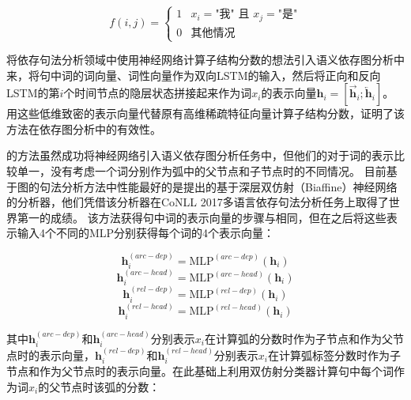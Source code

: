 \begin{equation}
f(i,j)=
\begin{cases}
1& x_i = \text{"我" 且\ } x_j = \text{"是"} \\
0& \text{其他情况}
\end{cases}
\end{equation}

将依存句法分析领域中使用神经网络计算子结构分数的想法引入语义依存图分析中来，将句中词的词向量、词性向量作为双向LSTM的输入，然后将正向和反向LSTM的第$i$个时间节点的隐层状态拼接起来作为词$x_i$的表示向量$\mathbf{h}_i=[\overrightarrow{\mathbf{h}}_i;\overleftarrow{\mathbf{h}}_i]$。用这些低维致密的表示向量代替原有高维稀疏特征向量计算子结构分数，证明了该方法在依存图分析中的有效性。

的方法虽然成功将神经网络引入语义依存图分析任务中，但他们的对于词的表示比较单一，没有考虑一个词分别作为弧中的父节点和子节点时的不同情况。
目前基于图的句法分析方法中性能最好的是提出的基于深层双仿射（Biaffine）神经网络的分析器，他们凭借该分析器在CoNLL 2017多语言依存句法分析任务上取得了世界第一的成绩。
该方法获得句中词的表示向量的步骤与相同，但在之后将这些表示输入4个不同的MLP分别获得每个词的4个表示向量：

\begin{equation}
\label{eq:arc-dep}
\mathbf{h}^{(arc-dep)}_i = \text{MLP}^{(arc-dep)}(\mathbf{h}_i)
\end{equation}
\begin{equation}
\label{eq:arc-head}
\mathbf{h}^{(arc-head)}_i = \text{MLP}^{(arc-head)}(\mathbf{h}_i)
\end{equation}
\begin{equation}
\label{eq:rel-dep}
\mathbf{h}^{(rel-dep)}_i = \text{MLP}^{(rel-dep)}(\mathbf{h}_i)
\end{equation}
\begin{equation}
\label{eq:rel-head}
\mathbf{h}^{(rel-head)}_i = \text{MLP}^{(rel-head)}(\mathbf{h}_i)
\end{equation}

其中$\mathbf{h}^{(arc-dep)}_i$和$\mathbf{h}^{(arc-head)}_i$分别表示$x_i$在计算弧的分数时作为子节点和作为父节点时的表示向量，$\mathbf{h}^{(rel-dep)}_i$和$\mathbf{h}^{(rel-head)}_i$分别表示$x_i$在计算弧标签分数时作为子节点和作为父节点时的表示向量。在此基础上利用双仿射分类器计算句中每个词作为词$x_i$的父节点时该弧的分数：

